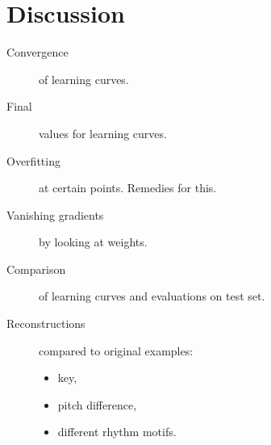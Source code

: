 \section{Discussion}
\label{sec:discussion}

\begin{description}
	\item[Convergence] of learning curves.
	\item[Final] values for learning curves.
	\item[Overfitting] at certain points. Remedies for this.
	\item[Vanishing gradients] by looking at weights.
	\item[Comparison] of learning curves and evaluations on test set.
	\item[Reconstructions] compared to original examples:
	
	\begin{itemize}
		\item key,
		\item pitch difference,
		\item different rhythm motifs.
	\end{itemize}
\end{description}

